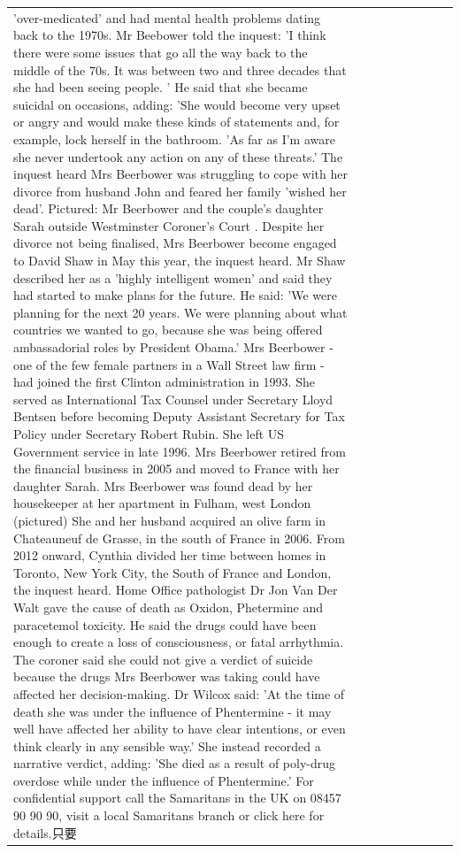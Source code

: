 \begin{table}[H]
\begin{tabular}{lllrlllll}
'over-medicated' and had mental health problems dating back to the 1970s. Mr Beebower told the inquest: 'I think there were some issues that go all the way back to the middle of the 70s. It was between two and three decades that she had been seeing people. ' He said that she became suicidal on occasions, adding: 'She would become very upset or angry and would make these kinds of statements and, for example, lock herself in the bathroom. 'As far as I'm aware she never undertook any action on any of these threats.' The inquest heard Mrs Beerbower was struggling to cope with her divorce from husband John and feared her family 'wished her dead'. Pictured: Mr Beerbower and the couple's daughter Sarah outside Westminster Coroner's Court . Despite her divorce not being finalised, Mrs Beerbower become engaged to David Shaw in May this year, the inquest heard. Mr Shaw described her as a 'highly intelligent women' and said they had started to make plans for the future. He said: 'We were planning for the next 20 years. We were planning about what countries we wanted to go, because she was being offered ambassadorial roles by President Obama.' Mrs Beerbower - one of the few female partners in a Wall Street law firm - had joined the first Clinton administration in 1993. She served as International Tax Counsel under Secretary Lloyd Bentsen before becoming Deputy Assistant Secretary for Tax Policy under Secretary Robert Rubin. She left US Government service in late 1996. Mrs Beerbower retired from the financial business in 2005 and moved to France with her daughter Sarah. Mrs Beerbower was found dead by her housekeeper at her apartment in Fulham, west London (pictured) She and her husband acquired an olive farm in Chateauneuf de Grasse, in the south of France in 2006. From 2012 onward, Cynthia divided her time between homes in Toronto, New York City, the South of France and London, the inquest heard. Home Office pathologist Dr Jon Van Der Walt gave the cause of death as Oxidon, Phetermine and paracetemol toxicity. He said the drugs could have been enough to create a loss of consciousness, or fatal arrhythmia. The coroner said she could not give a verdict of suicide because the drugs Mrs Beerbower was taking could have affected her decision-making. Dr Wilcox said: 'At the time of death she was under the influence of Phentermine - it may well have affected her ability to have clear intentions, or even think clearly in any sensible way.' She instead recorded a narrative verdict, adding: 'She died as a result of poly-drug overdose while under the influence of Phentermine.' For confidential support call the Samaritans in the UK on 08457 90 90 90, visit a local Samaritans branch or click here for details.只要 \\

\end{tabular}
\end{table}
